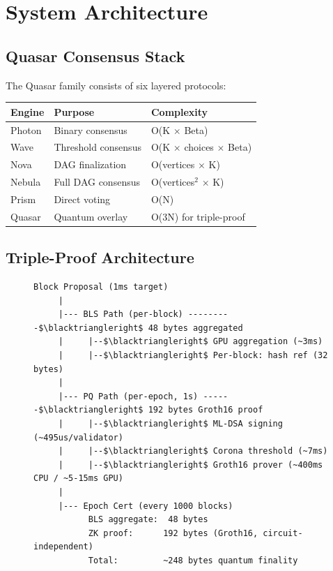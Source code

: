 \section{System Architecture}


\subsection{Quasar Consensus Stack}

The Quasar family consists of six layered protocols:

\begin{table}[h]
\centering
\begin{tabular}{@{}lll@{}}
\toprule
\textbf{Engine} & \textbf{Purpose} & \textbf{Complexity} \\
\midrule
Photon & Binary consensus & O(K $\times$ Beta) \\
Wave & Threshold consensus & O(K $\times$ choices $\times$ Beta) \\
Nova & DAG finalization & O(vertices $\times$ K) \\
Nebula & Full DAG consensus & O(vertices$^2$ $\times$ K) \\
Prism & Direct voting & O(N) \\
Quasar & Quantum overlay & O(3N) for triple-proof \\
\bottomrule
\end{tabular}

\label{tab:engines}
\end{table}

\subsection{Triple-Proof Architecture}

\begin{figure}[h]
\centering
\begin{verbatim}
Block Proposal (1ms target)
     |
     |--- BLS Path (per-block) ---------$\blacktriangleright$ 48 bytes aggregated
     |     |--$\blacktriangleright$ GPU aggregation (~3ms)
     |     |--$\blacktriangleright$ Per-block: hash ref (32 bytes)
     |
     |--- PQ Path (per-epoch, 1s) ------$\blacktriangleright$ 192 bytes Groth16 proof
     |     |--$\blacktriangleright$ ML-DSA signing (~495us/validator)
     |     |--$\blacktriangleright$ Corona threshold (~7ms)
     |     |--$\blacktriangleright$ Groth16 prover (~400ms CPU / ~5-15ms GPU)
     |
     |--- Epoch Cert (every 1000 blocks)
           BLS aggregate:  48 bytes
           ZK proof:      192 bytes (Groth16, circuit-independent)
           Total:         ~248 bytes quantum finality
\end{verbatim}

\label{fig:triple-proof}
\end{figure}

